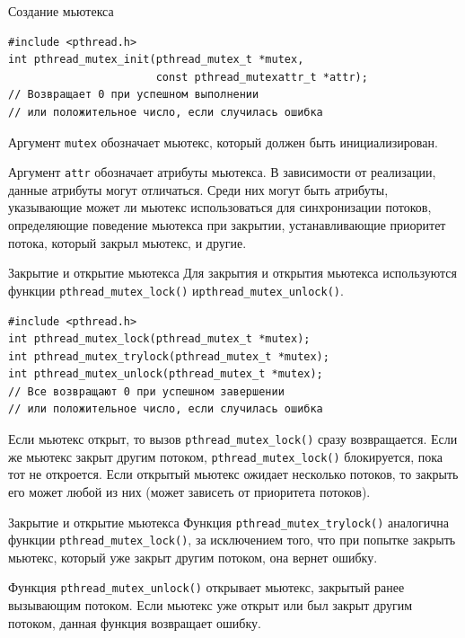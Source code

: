 \documentclass{beamer}
\begin{document}
\begin{frame}[fragile]{Создание мьютекса}
    \begin{verbatim}
#include <pthread.h>
int pthread_mutex_init(pthread_mutex_t *mutex,
                       const pthread_mutexattr_t *attr);
// Возвращает 0 при успешном выполнении 
// или положительное число, если случилась ошибка
    \end{verbatim}
    
    Аргумент \texttt{mutex} обозначает мьютекс, который должен быть инициализирован. 
    
    Аргумент \texttt{attr} обозначает атрибуты мьютекса. В зависимости от реализации, данные атрибуты могут отличаться. Среди них могут быть атрибуты, указывающие может ли мьютекс использоваться для синхронизации потоков, определяющие поведение мьютекса при закрытии, устанавливающие приоритет потока, который закрыл мьютекс, и другие.
\end{frame}

\begin{frame}[fragile]{Закрытие и открытие мьютекса}
    Для закрытия и открытия мьютекса используются функции \texttt{pthread\_mutex\_lock()} и\texttt{pthread\_mutex\_unlock()}.
    
    \begin{verbatim}
#include <pthread.h>
int pthread_mutex_lock(pthread_mutex_t *mutex);
int pthread_mutex_trylock(pthread_mutex_t *mutex);
int pthread_mutex_unlock(pthread_mutex_t *mutex);
// Все возвращают 0 при успешном завершении
// или положительное число, если случилась ошибка
    \end{verbatim}
    
    Если мьютекс открыт, то вызов \texttt{pthread\_mutex\_lock()} сразу возвращается. Если же мьютекс закрыт другим потоком, \texttt{pthread\_mutex\_lock()} блокируется, пока тот не откроется. Если открытый мьютекс ожидает несколько потоков, то закрыть его может любой из них (может зависеть от приоритета потоков).
\end{frame}

\begin{frame}{Закрытие и открытие мьютекса}
    Функция \texttt{pthread\_mutex\_trylock()} аналогична функции \texttt{pthread\_mutex\_lock()}, за исключением того, что при попытке закрыть мьютекс, который уже закрыт другим потоком, она вернет ошибку.
    
    Функция \texttt{pthread\_mutex\_unlock()} открывает мьютекс, закрытый ранее вызывающим потоком. Если мьютекс уже открыт или был закрыт другим потоком, данная функция возвращает ошибку. 
\end{frame}
\end{document}
